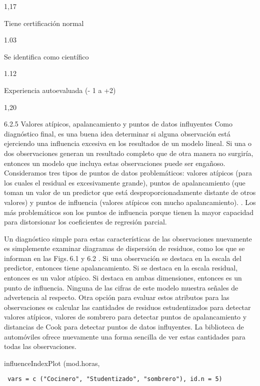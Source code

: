 \documentclass[
]{book}
\begin{document}
1,17

Tiene certificación normal

1.03

Se identifica como científico

1.12

Experiencia autoevaluada (- 1 a +2)

1,20

6.2.5 Valores atípicos, apalancamiento y puntos de datos influyentes
Como diagnóstico final, es una buena idea determinar si alguna observación está ejerciendo una influencia excesiva en los resultados de un modelo lineal. Si una o dos observaciones generan un resultado completo que de otra manera no surgiría, entonces un modelo que incluya estas observaciones puede ser engañoso. Consideramos tres tipos de puntos de datos problemáticos: valores atípicos (para los cuales el residual es excesivamente grande), puntos de apalancamiento (que toman un valor de un predictor que está desproporcionadamente distante de otros valores) y puntos de influencia (valores atípicos con mucho apalancamiento). . Los más problemáticos son los puntos de influencia porque tienen la mayor capacidad para distorsionar los coeficientes de regresión parcial.

Un diagnóstico simple para estas características de las observaciones nuevamente es simplemente examinar diagramas de dispersión de residuos, como los que se informan en las Figs. 6.1 y 6.2 . Si una observación se destaca en la escala del predictor, entonces tiene apalancamiento. Si se destaca en la escala residual, entonces es un valor atípico. Si destaca en ambas dimensiones, entonces es un punto de influencia. Ninguna de las cifras de este modelo muestra señales de advertencia al respecto. Otra opción para evaluar estos atributos para las observaciones es calcular las cantidades de residuos estudentizados para detectar valores atípicos, valores de sombrero para detectar puntos de apalancamiento y distancias de Cook para detectar puntos de datos influyentes. La biblioteca de automóviles ofrece nuevamente una forma sencilla de ver estas cantidades para todas las observaciones.

influenceIndexPlot (mod.horas,

\begin{verbatim}
 vars = c ("Cocinero", "Studentizado", "sombrero"), id.n = 5)
\end{verbatim}
\end{document}
